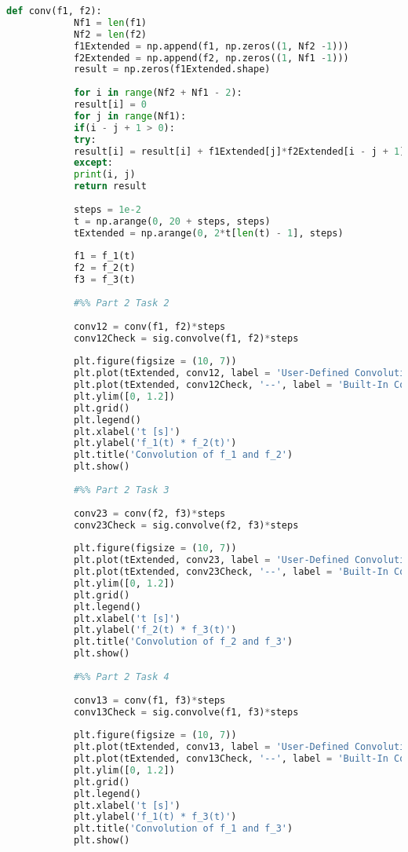 \documentclass[11pt,a4]{article}
\begin{document}
\begin{itemize}
\begin{lstlisting}[language=Python]
			def conv(f1, f2):
			Nf1 = len(f1)
			Nf2 = len(f2)
			f1Extended = np.append(f1, np.zeros((1, Nf2 -1)))
			f2Extended = np.append(f2, np.zeros((1, Nf1 -1)))
			result = np.zeros(f1Extended.shape)
			
			for i in range(Nf2 + Nf1 - 2):
			result[i] = 0
			for j in range(Nf1):
			if(i - j + 1 > 0):
			try:
			result[i] = result[i] + f1Extended[j]*f2Extended[i - j + 1]
			except:
			print(i, j)
			return result
			
			steps = 1e-2
			t = np.arange(0, 20 + steps, steps)
			tExtended = np.arange(0, 2*t[len(t) - 1], steps)
			
			f1 = f_1(t)
			f2 = f_2(t)
			f3 = f_3(t)
			
			#%% Part 2 Task 2
			
			conv12 = conv(f1, f2)*steps
			conv12Check = sig.convolve(f1, f2)*steps
			
			plt.figure(figsize = (10, 7))
			plt.plot(tExtended, conv12, label = 'User-Defined Convolution')
			plt.plot(tExtended, conv12Check, '--', label = 'Built-In Convolution')
			plt.ylim([0, 1.2])
			plt.grid()
			plt.legend()
			plt.xlabel('t [s]')
			plt.ylabel('f_1(t) * f_2(t)')
			plt.title('Convolution of f_1 and f_2')
			plt.show()
			
			#%% Part 2 Task 3
			
			conv23 = conv(f2, f3)*steps
			conv23Check = sig.convolve(f2, f3)*steps
			
			plt.figure(figsize = (10, 7))
			plt.plot(tExtended, conv23, label = 'User-Defined Convolution')
			plt.plot(tExtended, conv23Check, '--', label = 'Built-In Convolution')
			plt.ylim([0, 1.2])
			plt.grid()
			plt.legend()
			plt.xlabel('t [s]')
			plt.ylabel('f_2(t) * f_3(t)')
			plt.title('Convolution of f_2 and f_3')
			plt.show()
			
			#%% Part 2 Task 4
			
			conv13 = conv(f1, f3)*steps
			conv13Check = sig.convolve(f1, f3)*steps
			
			plt.figure(figsize = (10, 7))
			plt.plot(tExtended, conv13, label = 'User-Defined Convolution')
			plt.plot(tExtended, conv13Check, '--', label = 'Built-In Convolution')
			plt.ylim([0, 1.2])
			plt.grid()
			plt.legend()
			plt.xlabel('t [s]')
			plt.ylabel('f_1(t) * f_3(t)')
			plt.title('Convolution of f_1 and f_3')
			plt.show()
			
		\end{lstlisting}
		
	\end{itemize}
	
\end{document}
